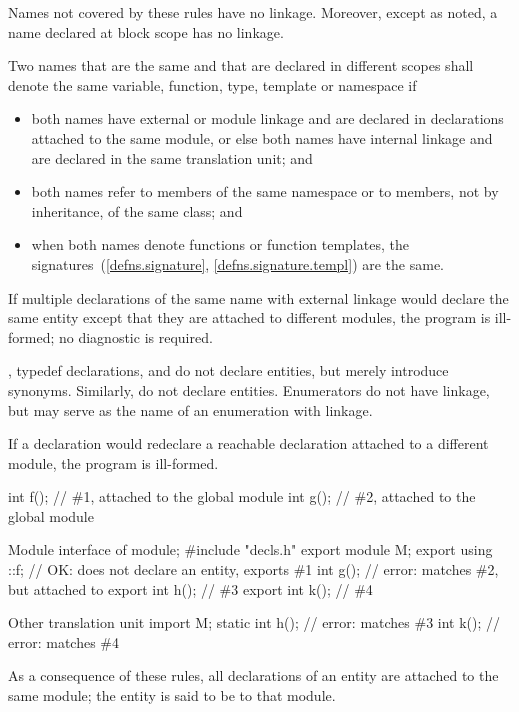 \pnum
{}%
Names not covered by these rules have no linkage. Moreover, except as
noted, a name declared at block scope has no
linkage.

\pnum
Two names that are the same and that are declared
in different scopes shall denote the same variable, function,
type, template or namespace if
\begin{itemize}
\item both names have external or module linkage
and are declared in declarations attached to the same module,
or else both names have internal linkage
and are declared in the same translation unit; and

\item both names refer to members of the same namespace or to members,
not by inheritance, of the same class; and

\item when both names denote functions or function templates,
the signatures~(\ref{defns.signature}, \ref{defns.signature.templ})
are the same.

\end{itemize}
If multiple declarations of the same name with external linkage
would declare the same entity except that
they are attached to different modules,
the program is ill-formed; no diagnostic is required.
\begin{note}
,
typedef declarations,
and 
do not declare entities, but merely introduce synonyms.
Similarly,
do not declare entities.
Enumerators do not have linkage,
but may serve as the name of an enumeration with linkage.
\end{note}

\pnum
If a declaration would redeclare a reachable declaration
attached to a different module, the program is ill-formed.
\begin{example}
\begin{codeblocktu}{}
int f();            // \#1, attached to the global module
int g();            // \#2, attached to the global module
\end{codeblocktu}

\begin{codeblocktu}{Module interface of }
module;
#include "decls.h"
export module M;
export using ::f;   // OK: does not declare an entity, exports \#1
int g();            // error: matches \#2, but attached to 
export int h();     // \#3
export int k();     // \#4
\end{codeblocktu}

\begin{codeblocktu}{Other translation unit}
import M;
static int h();     // error: matches \#3
int k();            // error: matches \#4
\end{codeblocktu}
\end{example}
As a consequence of these rules,
all declarations of an entity are attached to the same module;
the entity is said to be  to that module.

